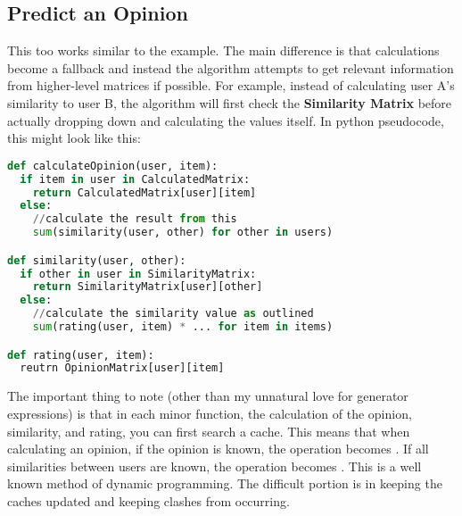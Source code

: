 \documentclass[12pt]{article}
\begin{document}
  \subsection{Predict an Opinion}
  \indent\indent This too works similar to the example.  The main difference is that calculations become a fallback and instead the algorithm attempts to get relevant information from higher-level matrices if possible.  For example, instead of calculating user A's similarity to user B, the algorithm will first check the \textbf{Similarity Matrix} before actually dropping down and calculating the values itself.  In python pseudocode, this might look like this:
  \begin{lstlisting}[language=python]
def calculateOpinion(user, item):
  if item in user in CalculatedMatrix:
    return CalculatedMatrix[user][item]
  else:
    //calculate the result from this
    sum(similarity(user, other) for other in users)

def similarity(user, other):
  if other in user in SimilarityMatrix:
    return SimilarityMatrix[user][other]
  else:
    //calculate the similarity value as outlined
    sum(rating(user, item) * ... for item in items)

def rating(user, item):
  reutrn OpinionMatrix[user][item]
  \end{lstlisting}
  \indent The important thing to note (other than my unnatural love for generator expressions) is that in each minor function, the calculation of the opinion, similarity, and rating, you can first search a cache.  This means that when calculating an opinion, if the opinion is known, the operation becomes .  If all similarities between users are known, the operation becomes .  This is a well known method of dynamic programming.  The difficult portion is in keeping the caches updated and keeping clashes from occurring.
\end{document}
